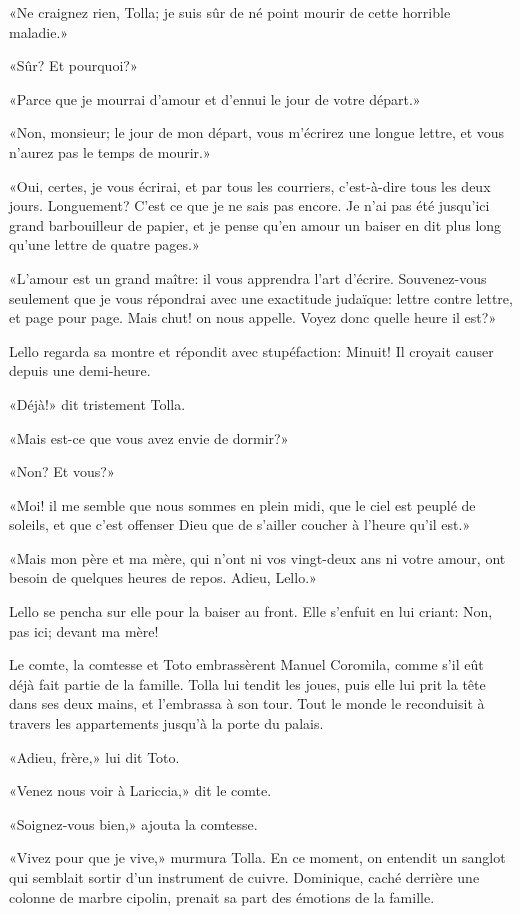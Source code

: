«Ne craignez rien, Tolla; je suis sûr de né point mourir de cette
horrible maladie.»

«Sûr? Et pourquoi?»

«Parce que je mourrai d'amour et d'ennui le jour de votre départ.»

«Non, monsieur; le jour de mon départ, vous m'écrirez une longue lettre,
et vous n'aurez pas le temps de mourir.»

«Oui, certes, je vous écrirai, et par tous les courriers, c'est-à-dire
tous les deux jours. Longuement? C'est ce que je ne sais pas encore. Je
n'ai pas été jusqu'ici grand barbouilleur de papier, et je pense qu'en
amour un baiser en dit plus long qu'une lettre de quatre pages.»

«L'amour est un grand maître: il vous apprendra l'art d'écrire.
Souvenez-vous seulement que je vous répondrai avec une exactitude
judaïque: lettre contre lettre, et page pour page. Mais chut! on nous
appelle. Voyez donc quelle heure il est?»

Lello regarda sa montre et répondit avec stupéfaction: Minuit! Il
croyait causer depuis une demi-heure.

«Déjà!» dit tristement Tolla.

«Mais est-ce que vous avez envie de dormir?»

«Non? Et vous?»

«Moi! il me semble que nous sommes en plein midi, que le ciel est peuplé
de soleils, et que c'est offenser Dieu que de s'ailler coucher à l'heure
qu'il est.»

«Mais mon père et ma mère, qui n'ont ni vos vingt-deux ans ni votre
amour, ont besoin de quelques heures de repos. Adieu, Lello.»

Lello se pencha sur elle pour la baiser au front. Elle s'enfuit en lui
criant: Non, pas ici; devant ma mère!

Le comte, la comtesse et Toto embrassèrent Manuel Coromila, comme s'il
eût déjà fait partie de la famille. Tolla lui tendit les joues, puis
elle lui prit la tête dans ses deux mains, et l'embrassa à son tour.
Tout le monde le reconduisit à travers les appartements jusqu'à la porte
du palais.

«Adieu, frère,» lui dit Toto.

«Venez nous voir à Lariccia,» dit le comte.

«Soignez-vous bien,» ajouta la comtesse.

«Vivez pour que je vive,» murmura Tolla. En ce moment, on entendit un
sanglot qui semblait sortir d'un instrument de cuivre. Dominique, caché
derrière une colonne de marbre cipolin, prenait sa part des émotions de
la famille.
